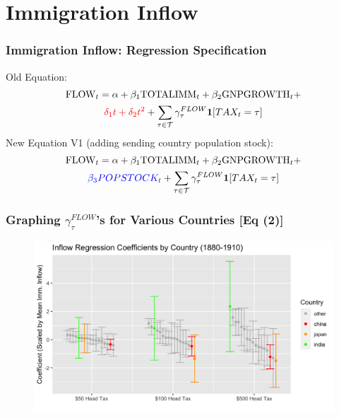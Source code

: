 \documentclass[pdf]{beamer}
\begin{document}
\section{Immigration Inflow}
\begin{frame}[label = flow_reg]
    \frametitle{Immigration Inflow: Regression Specification}
    Old Equation:
    \begin{multline}
        \text{FLOW}_t = \alpha + \beta_1\text{TOTALIMM}_t + \beta_2\text{GNPGROWTH}_t +  \\ \textcolor{red}{\delta_1 t + \delta_2 t^2} + \sum_{\tau \in \mathcal{T}} \gamma^{FLOW}_\tau \mathbf{1}[TAX_t = \tau] 
    \end{multline}
    New Equation V1 (adding sending country population stock):
    \begin{multline}
        \text{FLOW}_t = \alpha + \beta_1\text{TOTALIMM}_t + \beta_2\text{GNPGROWTH}_t +  \\ \textcolor{blue}{\beta_3 POPSTOCK_t} + \sum_{\tau \in \mathcal{T}} \gamma^{FLOW}_\tau \mathbf{1}[TAX_t = \tau] 
    \end{multline}
\end{frame}

\begin{frame}[label = flow_graph]
    \frametitle{Graphing $\gamma_\tau^{FLOW}$'s for Various Countries [Eq (2)]}
    \centering
    \begin{figure}
        \includegraphics[width = \textwidth]{../../figs/6sep23/reg_coefs.png}
    \end{figure}
    \hyperlink{flow_graph_old}{}
\end{frame}
\end{document}
